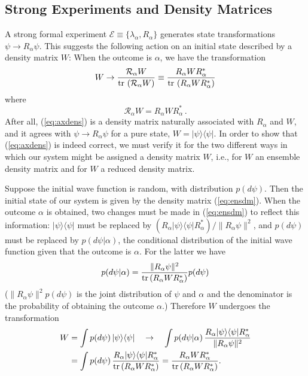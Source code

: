\documentclass[12pt]{article}
\newcommand{\eq}[1]{(\ref{#1})}
\newcommand{\wf}{wave function}
\renewcommand{\dagger}{\ast}
\newcommand{\tr}{\mbox{${\rm tr}\,$}}
\renewcommand{\a}{\alpha}
\newcommand{\la}{\lambda_{\a}}
\newcommand{\Aa}{R_{\a}}
\newcommand{\Aad}{R^{\dagger}_{\a}}
\newcommand{\norm}{\|}
\begin{document}
\subsection{Strong Experiments and Density Matrices}\label{secSEI}

A strong formal experiment $\mathcal{E}\equiv\{\la, \Aa\}$ generates
state transformations $\psi\to\Aa\psi$. This suggests the following
action on an initial state described by a density matrix $W$: When the
outcome is $\a$, we have the transformation
\begin{equation}
W \to \frac{\mathcal{R}_\a W}{\tr\left(\mathcal{R}_\a W\right) }
    \equiv \frac{\Aa W \Aad}{\tr\left( \Aa W \Aad \right)}
\label{eq:axdens}
\end{equation}
where
\begin{equation}
\mathcal{R}_\a W = \Aa W \Aad\,.
\label{eq:axdens2}
\end{equation}
After all, (\ref{eq:axdens}) is a density matrix naturally associated
with $\Aa$ and $W$, and it agrees with $\psi\to\Aa\psi$ for a pure
state, $W=| \psi \rangle \langle\psi|$. In order to show that
(\ref{eq:axdens}) is indeed correct, we must verify it for the two
different ways in which our system might be assigned a density matrix
$W$, i.e., for $W$ an ensemble density matrix and for $W$ a reduced
density matrix.

Suppose the initial wave function is random, with distribution
$p(d\psi)$. Then the initial state of our system is given by the
density matrix \eq{eq:ensdm}. When the outcome $\a$ is obtained, two
changes must be made in \eq{eq:ensdm} to reflect this information: $|
\psi \rangle \langle\psi|$ must be replaced by $ (\Aa| \psi \rangle
\langle\psi|\Aad)/ \norm\Aa\psi\norm^2 $, and $p(d\psi)$ must be
replaced by $p(d\psi|\a)$, the conditional distribution of the initial
\wf{} given that the outcome is $\a$. For the latter we have
$$
p(d\psi|\a)= \frac{\norm\Aa\psi\norm^2}{\tr( \Aa W\Aad)} p(d\psi)
$$
($ \norm\Aa\psi\norm^2p(d\psi)$ is the joint distribution of $\psi$
and $\a$ and the denominator is the probability of obtaining the
outcome $\a$.) Therefore $W$ undergoes the transformation
\begin{equation*}
\begin{split}
W &= \int p(d\psi )\,| \psi \rangle \langle \psi | \quad\to\quad \int
p(d\psi|\a) \,\frac{\Aa| \psi \rangle \langle
   \psi|\Aad}{\norm\Aa\psi\norm^2}\\ &= \int p (d\psi )\, \frac{\Aa | \psi
   \rangle \langle \psi| \Aad}{\tr( \Aa W\Aad)} = \frac{\Aa W
   \Aad}{\tr( \Aa W\Aad)} .
\end{split}
\end{equation*}
\end{document}

